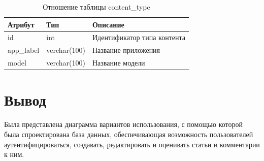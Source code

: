 \begin{table}[H]
	\centering
	\caption{Отношение таблицы content\_type}
	\label{tbl:django_content_type}
	\begin{tabular}{|l|l|l|}
		\hline
		\textbf{Атрибут} & \textbf{Тип} & \textbf{Описание}           \\ \hline
		id               & int          & Идентификатор типа контента \\ \hline
		app\_label       & verchar(100) & Название приложения         \\ \hline
		model            & verchar(100) & Название модели             \\ \hline
	\end{tabular}
\end{table}

\section*{Вывод}

Была представлена диаграмма вариантов использования, с помощью которой была спроектирована база данных, обеспечивающая возможность пользователей аутентифицироваться, создавать, редактировать и оценивать статьи и комментарии к ним.
